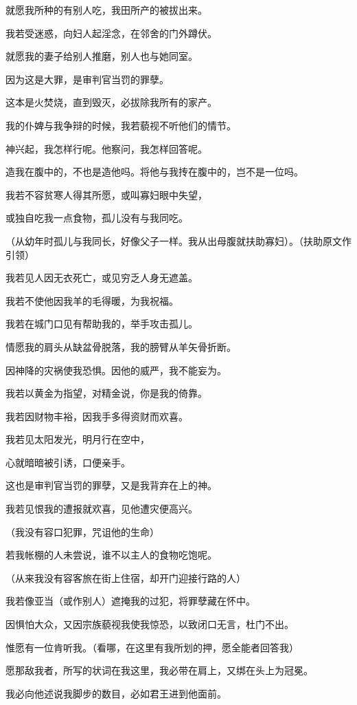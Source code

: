 \documentclass[12pt,oneside]{book}
\begin{document}
就愿我所种的有别人吃，我田所产的被拔出来。

我若受迷惑，向妇人起淫念，在邻舍的门外蹲伏。

就愿我的妻子给别人推磨，别人也与她同室。

因为这是大罪，是审判官当罚的罪孽。

这本是火焚烧，直到毁灭，必拔除我所有的家产。

我的仆婢与我争辩的时候，我若藐视不听他们的情节。

神兴起，我怎样行呢。他察问，我怎样回答呢。

造我在腹中的，不也是造他吗。将他与我抟在腹中的，岂不是一位吗。

我若不容贫寒人得其所愿，或叫寡妇眼中失望，

或独自吃我一点食物，孤儿没有与我同吃。

（从幼年时孤儿与我同长，好像父子一样。我从出母腹就扶助寡妇）。（扶助原文作引领）

我若见人因无衣死亡，或见穷乏人身无遮盖。

我若不使他因我羊的毛得暖，为我祝福。

我若在城门口见有帮助我的，举手攻击孤儿。

情愿我的肩头从缺盆骨脱落，我的膀臂从羊矢骨折断。

因神降的灾祸使我恐惧。因他的威严，我不能妄为。

我若以黄金为指望，对精金说，你是我的倚靠。

我若因财物丰裕，因我手多得资财而欢喜。

我若见太阳发光，明月行在空中，

心就暗暗被引诱，口便亲手。

这也是审判官当罚的罪孽，又是我背弃在上的神。

我若见恨我的遭报就欢喜，见他遭灾便高兴。

（我没有容口犯罪，咒诅他的生命）

若我帐棚的人未尝说，谁不以主人的食物吃饱呢。

（从来我没有容客旅在街上住宿，却开门迎接行路的人）

我若像亚当（或作别人）遮掩我的过犯，将罪孽藏在怀中。

因惧怕大众，又因宗族藐视我使我惊恐，以致闭口无言，杜门不出。

惟愿有一位肯听我。（看哪，在这里有我所划的押，愿全能者回答我）

愿那敌我者，所写的状词在我这里，我必带在肩上，又绑在头上为冠冕。

我必向他述说我脚步的数目，必如君王进到他面前。
\end{document}
